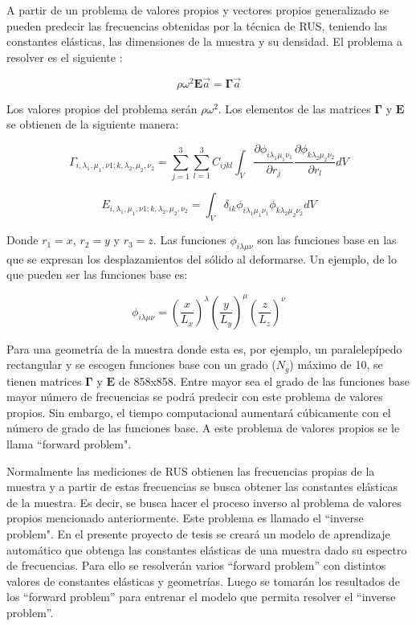 \documentclass[12pt]{article}
\begin{document}
A partir de un problema de valores propios y vectores propios generalizado se pueden predecir las frecuencias obtenidas por la técnica de RUS, teniendo las constantes elásticas, las dimensiones de la muestra y su densidad. El problema a resolver es el siguiente \cite{Leisure_1997}:

\begin{equation}
    \rho \omega^2 \bm{E} \vec{a} = \bm{\Gamma} \vec{a} 
\end{equation}

Los valores propios del problema serán $\rho \omega^2$. Los elementos de las matrices $\bm{\Gamma}$ y $\bm{E}$ se obtienen de la siguiente manera: 

\begin{equation}
    \Gamma_{i, \lambda_1, \mu_1,  \nu1; k, \lambda_2, \mu_2, \nu_2} = \sum_{j=1}^{3} \sum_{l=1}^{3} {C_{ijkl} \int_{V}{\frac{\partial \phi_{i \lambda_{1} \mu_1 \nu_1}}{\partial r_j} \frac{\partial \phi_{k \lambda_2 \mu_2 \nu_2}}{\partial r_l} dV}}
\end{equation}

\begin{equation}
    E_{i, \lambda_1, \mu_1,  \nu1; k, \lambda_2, \mu_2, \nu_2} = \int_{V}{\delta_{ik} \phi_{i \lambda_1 \mu_1 \nu_1}  \phi_{k \lambda_2 \mu_2 \nu_2} dV}
\end{equation}

Donde $r_1 = x$, $r_2 = y$ y  $r_3 = z$. Las funciones $\phi_{i \lambda \mu \nu}$ son las funciones base en las que se expresan los desplazamientos del sólido al deformarse. Un ejemplo, de lo que pueden ser las funciones base es: 

\begin{equation}
    \phi_{i \lambda \mu \nu} = \left(\frac{x}{L_x} \right)^{\lambda} \left(\frac{y}{L_y} \right)^{\mu} \left(\frac{z}{L_z} \right)^{\nu}
\end{equation}

Para una geometría de la muestra donde esta es, por ejemplo, un paralelepípedo rectangular y se escogen funciones base con un grado ($N_g$) máximo de 10, se tienen matrices $\bm{\Gamma}$ y $\bm{E}$ de 858x858. Entre mayor sea el grado de las funciones base mayor número de frecuencias se podrá predecir con este problema de valores propios. Sin embargo, el tiempo computacional aumentará cúbicamente con el número de grado de las funciones base. A este problema de valores propios se le llama ``forward problem".

Normalmente las mediciones de RUS obtienen las frecuencias propias de la muestra y a partir de estas frecuencias se busca obtener las constantes elásticas de la muestra. Es decir, se busca hacer el proceso inverso al problema de valores propios mencionado anteriormente. Este problema es llamado el ``inverse problem". En el presente proyecto de tesis se creará un modelo de aprendizaje automático que obtenga las constantes elásticas de una muestra dado su espectro de frecuencias. Para ello se resolverán varios ``forward problem'' con distintos valores de constantes elásticas y geometrías. Luego se tomarán los resultados de los ``forward problem'' para entrenar el modelo que permita resolver el ``inverse problem''.
\end{document}
